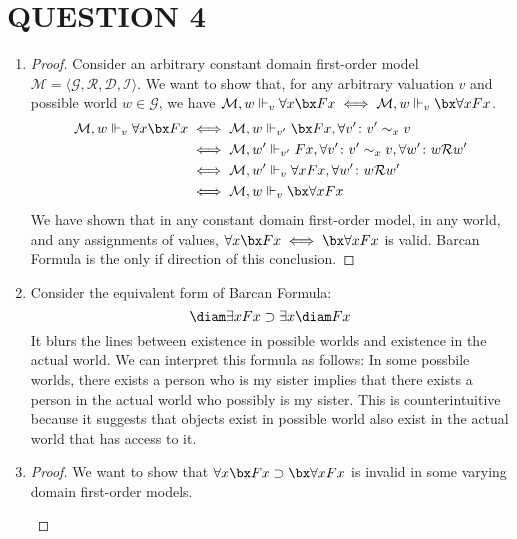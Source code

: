\section*{QUESTION 4}
\begin{enumerate}[label=\alph*)]
\item
\begin{proof}
Consider an arbitrary constant domain first-order model $\mathcal{M} = \langle \mathcal{G}, \mathcal{R}, \mathcal{D}, \mathcal{I} \rangle$. We want to show that, for any arbitrary valuation $v$ and possible world $w \in \mathcal{G}$, we have $\mathcal{M}, w \Vdash_{v} \forall x \bx Fx \iff \mathcal{M}, w \Vdash_{v} \bx \forall x Fx$.
\begin{align*}
\mathcal{M}, w \Vdash_{v} \forall x \bx Fx
&\iff \mathcal{M}, w \Vdash_{v'} \bx Fx, \forall v' \colon v' \sim_x v \\
&\iff \mathcal{M}, w' \Vdash_{v'} Fx, \forall v' \colon v' \sim_x v, \forall w' \colon w\mathcal{R}w' \\
&\iff \mathcal{M}, w' \Vdash_{v} \forall x Fx, \forall w' \colon w\mathcal{R}w' \\
&\iff \mathcal{M}, w \Vdash_{v} \bx \forall x Fx
\end{align*}
We have shown that in any constant domain first-order model, in any world, and any assignments of values, $\forall x \bx Fx \iff \bx \forall x Fx$ is valid. Barcan Formula is the only if direction of this conclusion.
\end{proof}

\item
Consider the equivalent form of Barcan Formula:
\[ \diam \exists x Fx \supset \exists x \diam Fx \]
It blurs the lines between existence in possible worlds and existence in the actual world. We can interpret this formula as follows: In some possbile worlds, there exists a person who is my sister implies that there exists a person in the actual world who possibly is my sister. This is counterintuitive because it suggests that objects exist in possible world also exist in the actual world that has access to it.

\item
\begin{proof}
We want to show that $\forall x \bx Fx \supset \bx \forall x Fx$ is invalid in some varying domain first-order models.

\begin{center}
\end{center}
\end{proof}
\end{enumerate}
